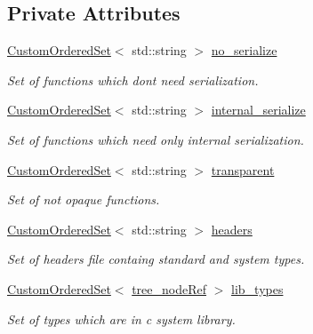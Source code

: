 \subsection*{Private Attributes}
\begin{DoxyCompactItemize}
\item 
\hyperlink{classCustomOrderedSet}{Custom\+Ordered\+Set}$<$ std\+::string $>$ \hyperlink{classFunctionExpander_ac03b5e196a1f2c49e114fc442b1b6b2a}{no\+\_\+serialize}
\begin{DoxyCompactList}\small\item\em Set of functions which don\textquotesingle{}t need serialization. \end{DoxyCompactList}\item 
\hyperlink{classCustomOrderedSet}{Custom\+Ordered\+Set}$<$ std\+::string $>$ \hyperlink{classFunctionExpander_ad53e6ea711a172f209a7fbf437fc2c30}{internal\+\_\+serialize}
\begin{DoxyCompactList}\small\item\em Set of functions which need only internal serialization. \end{DoxyCompactList}\item 
\hyperlink{classCustomOrderedSet}{Custom\+Ordered\+Set}$<$ std\+::string $>$ \hyperlink{classFunctionExpander_a5111c45183f4a133cae17775d8debe26}{transparent}
\begin{DoxyCompactList}\small\item\em Set of not opaque functions. \end{DoxyCompactList}\item 
\hyperlink{classCustomOrderedSet}{Custom\+Ordered\+Set}$<$ std\+::string $>$ \hyperlink{classFunctionExpander_a736cf8002692b5e0731b45865ee8f16e}{headers}
\begin{DoxyCompactList}\small\item\em Set of headers file containg standard and system types. \end{DoxyCompactList}\item 
\hyperlink{classCustomOrderedSet}{Custom\+Ordered\+Set}$<$ \hyperlink{tree__node_8hpp_a6ee377554d1c4871ad66a337eaa67fd5}{tree\+\_\+node\+Ref} $>$ \hyperlink{classFunctionExpander_ac2448a1dbf050de234c4a698f360f2f5}{lib\+\_\+types}
\begin{DoxyCompactList}\small\item\em Set of types which are in c system library. \end{DoxyCompactList}\end{DoxyCompactItemize}


